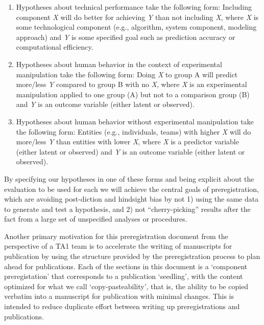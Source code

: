 \begin{enumerate}

    \item Hypotheses about technical performance take the following form:
        Including component \emph{X} will do better for achieving \emph{Y} than
        not including \emph{X}, where \emph{X} is some technological component
        (e.g., algorithm, system component, modeling approach) and \emph{Y} is
        some specified goal such as prediction accuracy or computational
        efficiency.

    \item Hypotheses about human behavior in the context of experimental
        manipulation take the following form: Doing \emph{X} to group A will
        predict more/less \emph{Y} compared to group B with no \emph{X}, where
        \emph{X} is an experimental manipulation applied to one group (A) but
        not to a comparison group (B) and \emph{Y} is an outcome variable
        (either latent or observed).

    \item Hypotheses about human behavior without experimental manipulation
        take the following form: Entities (e.g., individuals, teams) with
        higher \emph{X} will do more/less \emph{Y} than entities with lower
        \emph{X}, where \emph{X} is a predictor variable (either latent or
        observed) and \emph{Y} is an outcome variable (either latent or
        observed).

\end{enumerate}

By specifying our hypotheses in one of these forms and being explicit about the evaluation to be used for each we will achieve the central goals of preregistration, which are avoiding post-diction and hindsight bias by not 1) using the same data to generate and test a hypothesis, and 2) not “cherry-picking” results after the fact from a large set of unspecified analyses or procedures.

Another primary motivation for this preregistration document from the perspective of a TA1 team is to accelerate the writing of manuscripts for publication by using the structure provided by the preregistration process to plan ahead for publications. Each of the sections in this document is a ‘component preregistation’ that corresponds to a publication ‘seedling’, with the content optimized for what we call ‘copy-pasteability’, that is, the ability to be copied verbatim into a manuscript for publication with minimal changes. This is intended to reduce duplicate effort between writing up preregistrations and publications.

